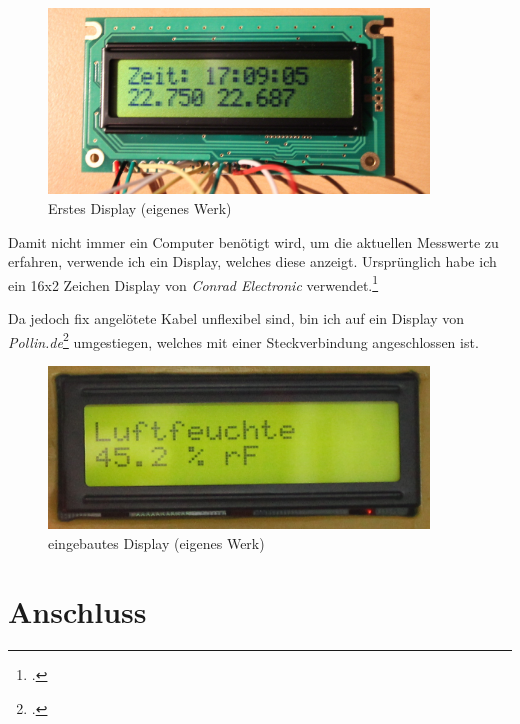 \begin{figure}[h]
  \centering
     \includegraphics[width=0.9\textwidth]{figures/erstes_display.jpg}
  \caption{Erstes Display (eigenes Werk)}
  \label{fig:erstes_display}
\end{figure}

Damit nicht immer ein Computer benötigt wird, um die aktuellen Messwerte zu erfahren, verwende ich ein Display, welches diese anzeigt. Ursprünglich habe ich ein 16x2 Zeichen Display von \textit{Conrad Electronic} verwendet.\footcite{conrad_datenblatt}

Da jedoch fix angelötete Kabel unflexibel sind, bin ich auf ein Display von \textit{Pollin.de}\footcite{display_pollin} umgestiegen, welches mit einer Steckverbindung angeschlossen ist.


\begin{figure}[h]
  \centering
     \includegraphics[width=0.9\textwidth]{figures/display.jpg}
  \caption{eingebautes Display (eigenes Werk)}
  \label{fig:display}
\end{figure}

\section{Anschluss}
